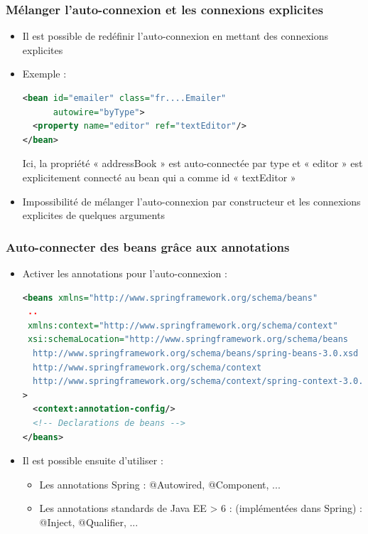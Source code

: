 \documentclass{beamer}
\begin{document}
\begin{frame}[fragile]
  \frametitle{Mélanger l'auto-connexion et les connexions explicites}
  \begin{itemize}
  \item Il est possible de redéfinir l'auto-connexion en mettant des
    connexions explicites
  \item Exemple :
\begin{lstlisting}[language=XML,basicstyle=\scriptsize]    
<bean id="emailer" class="fr....Emailer"
      autowire="byType">
  <property name="editor" ref="textEditor"/>
</bean>
\end{lstlisting}

Ici, la propriété « addressBook » est auto-connectée par type
et « editor » est explicitement connecté au bean qui a comme
id « textEditor »

\item Impossibilité de mélanger l'auto-connexion par constructeur
et les connexions explicites de quelques arguments
\end{itemize}
\end{frame}

\begin{frame}[fragile]
  \frametitle{Auto-connecter des beans grâce aux annotations}
  \begin{itemize}
  \item Activer les annotations pour l'auto-connexion :
\begin{lstlisting}[language=XML,basicstyle=\tiny]    
<beans xmlns="http://www.springframework.org/schema/beans"
 ..
 xmlns:context="http://www.springframework.org/schema/context"
 xsi:schemaLocation="http://www.springframework.org/schema/beans
  http://www.springframework.org/schema/beans/spring-beans-3.0.xsd
  http://www.springframework.org/schema/context
  http://www.springframework.org/schema/context/spring-context-3.0.xsd"
>
  <context:annotation-config/>
  <!-- Declarations de beans -->
</beans>
\end{lstlisting}
\item Il est possible ensuite d'utiliser :
  \begin{itemize}
\item Les annotations Spring : @Autowired, @Component, ...
\item Les annotations standards de Java EE > 6 : (implémentées dans
Spring) : @Inject, @Qualifier, ...
\end{itemize}

  \end{itemize}
\end{frame}
\end{document}
